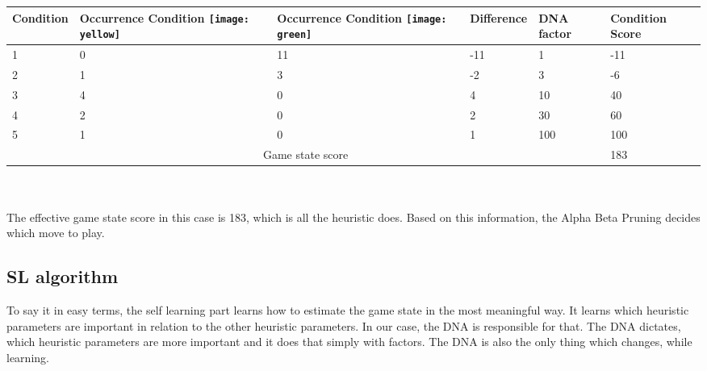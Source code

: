 \begin{tabularx}{\textwidth}{|X|X|X|X|X|X|}
\hline
Condition & Occurrence Condition \texttt{[image: yellow]}  & Occurrence Condition \texttt{[image: green]}  & Difference & DNA factor & Condition Score \\\hline
1	& 0	& 11	& -11	& 1 	& -11 \\\hline
2	& 1	& 3 	& -2	& 3 	& -6 \\\hline
3	& 4	& 0 	& 4 	& 10	& 40 \\\hline
4	& 2	& 0 	& 2 	& 30	& 60 \\\hline
5	& 1	& 0 	& 1 	& 100	& 100 \\\hline
\multicolumn{5}{|c|}{Game state score}&183 \\\hline
\end{tabularx}\\
\\
The effective game state score in this case is 183, which is all the heuristic does.
Based on this information, the Alpha Beta Pruning decides which move to play.



\subsection{\acl*{SL} algorithm} \label{selflearning}
To say it in easy terms, the self learning part learns how to estimate the game state in the most meaningful way. It learns which heuristic parameters are important in relation to the other heuristic parameters. In our case, the \ac{DNA}  is responsible for that. The \ac{DNA} dictates, which heuristic parameters are more important and it does that simply with factors. The \ac{DNA} is also the only thing which changes, while learning.


